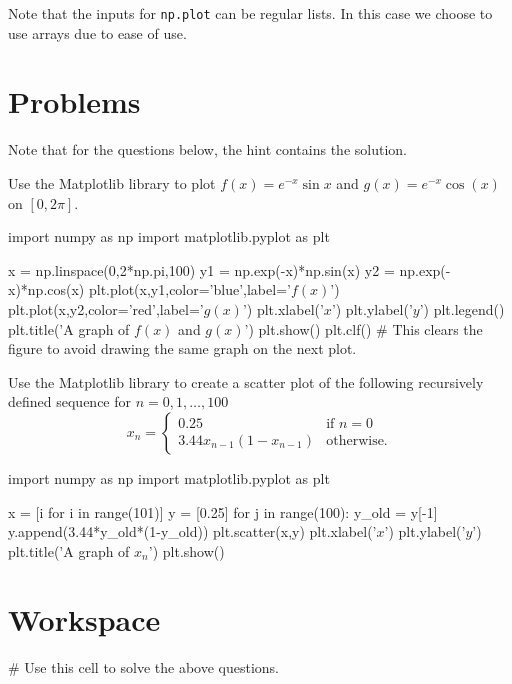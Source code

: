 \documentclass{ximera}
\begin{document}
Note that the inputs for \verb|np.plot| can be regular lists. In this case we choose to use arrays due to ease of use.

\section{Problems}

Note that for the questions below, the hint contains the solution.

\begin{question}
Use the Matplotlib library to plot $f(x)=e^{-x}\sin{x}$ and $g(x)=e^{-x}\cos(x)$ on $[0,2\pi]$.
	\begin{hint}
		\begin{sageCell}
import numpy as np
import matplotlib.pyplot as plt

x = np.linspace(0,2*np.pi,100)
y1 = np.exp(-x)*np.sin(x)
y2 = np.exp(-x)*np.cos(x)
plt.plot(x,y1,color='blue',label='$f(x)$')
plt.plot(x,y2,color='red',label='$g(x)$')
plt.xlabel('$x$')
plt.ylabel('$y$')
plt.legend()
plt.title('A graph of $f(x)$ and $g(x)$')
plt.show()
plt.clf() # This clears the figure to avoid drawing the same graph on the next plot.
\end{sageCell}
	\end{hint}
\end{question}

\begin{question}
Use the Matplotlib library to create a scatter plot of the following recursively defined sequence for $n=0,1,\dots,100$ $$x_n=\begin{cases}0.25 & \text{if $n=0$}\\ 3.44x_{n-1}(1-x_{n-1}) & \text{otherwise.}\end{cases}$$
	\begin{hint}
\begin{sageCell}
import numpy as np
import matplotlib.pyplot as plt

x = [i for i in range(101)]
y = [0.25]
for j in range(100):
	y_old = y[-1]
	y.append(3.44*y_old*(1-y_old))
plt.scatter(x,y)
plt.xlabel('$x$')
plt.ylabel('$y$')
plt.title('A graph of $x_n$')
plt.show()
\end{sageCell}
	\end{hint}
\end{question}

\section{Workspace}

\begin{sageCell}
# Use this cell to solve the above questions.
\end{sageCell}
\end{document}
